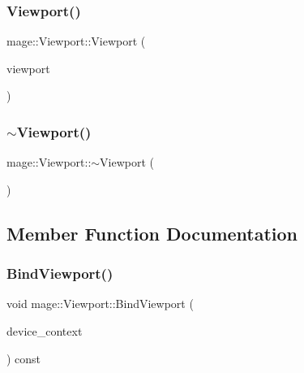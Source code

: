 \hypertarget{structmage_1_1_viewport_a314686e3b925a4158418a98ba28c4fc6}{}\label{structmage_1_1_viewport_a314686e3b925a4158418a98ba28c4fc6} 
\subsubsection{\texorpdfstring{Viewport()}{Viewport()}\hspace{0.1cm}{\footnotesize\ttfamily [5/5]}}
{\footnotesize\ttfamily mage\+::\+Viewport\+::\+Viewport (\begin{DoxyParamCaption}\item[{\hyperlink{structmage_1_1_viewport}{Viewport} \&\&}]{viewport }\end{DoxyParamCaption})\hspace{0.3cm}{\ttfamily [default]}}

\hypertarget{structmage_1_1_viewport_a6fcf68e154b186d5c6241c495cc93fe5}{}\label{structmage_1_1_viewport_a6fcf68e154b186d5c6241c495cc93fe5} 
\subsubsection{\texorpdfstring{$\sim$\+Viewport()}{~Viewport()}}
{\footnotesize\ttfamily mage\+::\+Viewport\+::$\sim$\+Viewport (\begin{DoxyParamCaption}{ }\end{DoxyParamCaption})\hspace{0.3cm}{\ttfamily [default]}}



\subsection{Member Function Documentation}
\hypertarget{structmage_1_1_viewport_a90dc0a655ae756c85085b12c6442b8c3}{}\label{structmage_1_1_viewport_a90dc0a655ae756c85085b12c6442b8c3} 
\subsubsection{\texorpdfstring{Bind\+Viewport()}{BindViewport()}}
{\footnotesize\ttfamily void mage\+::\+Viewport\+::\+Bind\+Viewport (\begin{DoxyParamCaption}\item[{I\+D3\+D11\+Device\+Context2 $\ast$}]{device\+\_\+context }\end{DoxyParamCaption}) const\hspace{0.3cm}{\ttfamily [noexcept]}}

